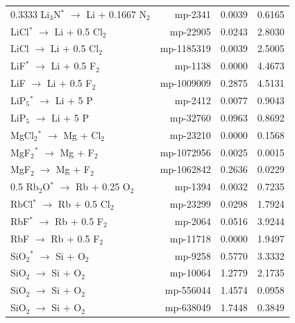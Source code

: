 \begin{longtable}{@{}lrrr@{}}
0.3333 Li$_{3}$N$^*$ $\rightarrow$ Li + 0.1667 N$_{2}$ & mp-2341 & 0.0039 & 0.6165 \\
LiCl$^*$ $\rightarrow$ Li + 0.5 Cl$_{2}$ & mp-22905 & 0.0243 & 2.8030 \\
LiCl $\rightarrow$ Li + 0.5 Cl$_{2}$ & mp-1185319 & 0.0039 & 2.5005 \\
LiF$^*$ $\rightarrow$ Li + 0.5 F$_{2}$ & mp-1138 & 0.0000 & 4.4673 \\
LiF $\rightarrow$ Li + 0.5 F$_{2}$ & mp-1009009 & 0.2875 & 4.5131 \\
LiP$_{5}$$^*$ $\rightarrow$ Li + 5 P & mp-2412 & 0.0077 & 0.9043 \\
LiP$_{5}$ $\rightarrow$ Li + 5 P & mp-32760 & 0.0963 & 0.8692 \\
MgCl$_{2}$$^*$ $\rightarrow$ Mg + Cl$_{2}$ & mp-23210 & 0.0000 & 0.1568 \\
MgF$_{2}$$^*$ $\rightarrow$ Mg + F$_{2}$ & mp-1072956 & 0.0025 & 0.0015 \\
MgF$_{2}$ $\rightarrow$ Mg + F$_{2}$ & mp-1062842 & 0.2636 & 0.0229 \\
0.5 Rb$_{2}$O$^*$ $\rightarrow$ Rb + 0.25 O$_{2}$ & mp-1394 & 0.0032 & 0.7235 \\
RbCl$^*$ $\rightarrow$ Rb + 0.5 Cl$_{2}$ & mp-23299 & 0.0298 & 1.7924 \\
RbF$^*$ $\rightarrow$ Rb + 0.5 F$_{2}$ & mp-2064 & 0.0516 & 3.9244 \\
RbF $\rightarrow$ Rb + 0.5 F$_{2}$ & mp-11718 & 0.0000 & 1.9497 \\
SiO$_{2}$$^*$ $\rightarrow$ Si + O$_{2}$ & mp-9258 & 0.5770 & 3.3332 \\
SiO$_{2}$ $\rightarrow$ Si + O$_{2}$ & mp-10064 & 1.2779 & 2.1735 \\
SiO$_{2}$ $\rightarrow$ Si + O$_{2}$ & mp-556044 & 1.4574 & 0.0958 \\
SiO$_{2}$ $\rightarrow$ Si + O$_{2}$ & mp-638049 & 1.7448 & 0.3849 \\
\end{longtable}
